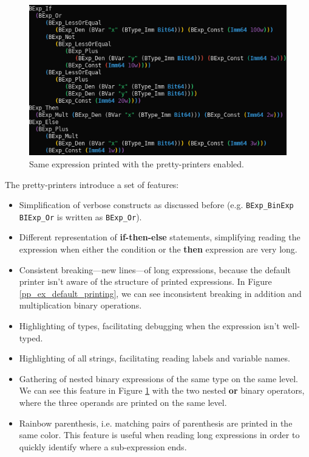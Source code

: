 \documentclass{kththesis}
\begin{document}
{\begin{figure}[!h]
	\includegraphics[width=\textwidth]{figures/pp_ex_pretty_printing.png}
	\centering
	\caption{Same expression printed with the pretty-printers enabled.}
	\label{pp_ex_pretty_printing}
\end{figure}

The pretty-printers introduce a set of features:

\begin{itemize}
    \item Simplification of verbose constructs as discussed before (e.g. \texttt{BExp\_BinExp BIExp\_Or} is written as \texttt{BExp\_Or}).
    \item Different representation of \textbf{if-then-else} statements, simplifying reading the expression when either the condition or the \textbf{then} expression are very long.
    \item Consistent breaking---new lines---of long expressions, because the default printer isn't aware of the structure of printed expressions. In Figure \ref{pp_ex_default_printing}, we can see inconsistent breaking in addition and multiplication binary operations.
    \item Highlighting of types, facilitating debugging when the expression isn't well-typed.
    \item Highlighting of all strings, facilitating reading labels and variable names.
    \item Gathering of nested binary expressions of the same type on the same level. We can see this feature in Figure \ref{pp_ex_pretty_printing} with the two nested \textbf{or} binary operators, where the three operands are printed on the same level.
    \item Rainbow parenthesis, i.e. matching pairs of parenthesis are printed in the same color. This feature is useful when reading long expressions in order to quickly identify where a sub-expression ends.
\end{itemize}

}
\end{document}
